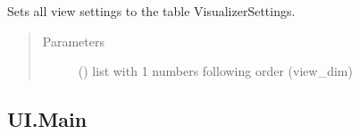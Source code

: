 \documentclass[letterpaper,10pt,english]{sphinxmanual}
\begin{document}
\begin{fulllineitems}
\begin{fulllineitems}
\end{fulllineitems}


\begin{fulllineitems}
\label{\detokenize{api:beamon.database.database.Database.set_view_settings}}
Sets all view settings to the table VisualizerSettings.
\begin{quote}\begin{description}
\item[{Parameters}] \leavevmode
{} () \textendash{} list with 1 numbers following order (view\_dim)

\end{description}\end{quote}

\end{fulllineitems}


\end{fulllineitems}



\subsection{UI.Main}
\label{\detokenize{api:module-beamon.ui.main}}\label{\detokenize{api:ui-main}}
\end{document}
